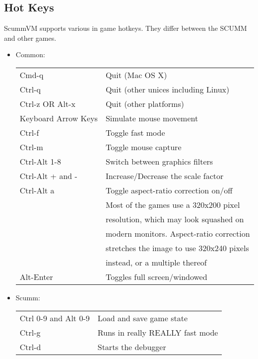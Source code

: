 

\subsection{Hot Keys}
ScummVM supports various in game hotkeys. They differ between the SCUMM and
other games.
\begin{itemize}
\item Common:\\
  \begin{tabular}{ll}
    Cmd-q                  & Quit (Mac OS X)\\
    Ctrl-q                 & Quit (other unices including Linux)\\
    Ctrl-z OR Alt-x        & Quit (other platforms)\\
    Keyboard Arrow Keys    & Simulate mouse movement\\
    Ctrl-f                 & Toggle fast mode\\
    Ctrl-m                 & Toggle mouse capture\\
    Ctrl-Alt 1-8           & Switch between graphics filters\\
    Ctrl-Alt + and -       & Increase/Decrease the scale factor\\
    Ctrl-Alt a             & Toggle aspect-ratio correction on/off\\
                           & Most of the games use a 320x200 pixel\\
                           & resolution, which may look squashed on\\
                           & modern monitors. Aspect-ratio correction\\
                           & stretches the image to use 320x240 pixels\\
                           & instead, or a multiple thereof\\
    Alt-Enter              & Toggles full screen/windowed\\
  \end{tabular}
\item Scumm:\\
  \begin{tabular}{ll}
    Ctrl 0-9 and Alt 0-9   & Load and save game state\\
    Ctrl-g                 & Runs in really REALLY fast mode\\
    Ctrl-d                 & Starts the debugger\\

\end{tabular}
\end{itemize}
